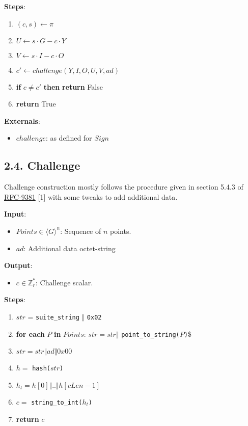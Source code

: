 \documentclass[
]{article}
\providecommand{\tightlist}{%
  \setlength{\itemsep}{0pt}\setlength{\parskip}{0pt}}
\begin{document}
\textbf{Steps}:

\begin{enumerate}
\def\labelenumi{\arabic{enumi}.}
\tightlist
\item
  \((c, s) \leftarrow \pi\)
\item
  \(U \leftarrow s \cdot G - c \cdot Y\)
\item
  \(V \leftarrow s \cdot I - c \cdot O\)
\item
  \(c' \leftarrow challenge(Y, I, O, U, V, ad)\)
\item
  \textbf{if} \(c \neq c'\) \textbf{then} \textbf{return} False
\item
  \textbf{return} True
\end{enumerate}

\textbf{Externals}:

\begin{itemize}
\tightlist
\item
  \(challenge\): as defined for \(Sign\)
\end{itemize}

\hypertarget{challenge}{%
\subsection{2.4. Challenge}\label{challenge}}

Challenge construction mostly follows the procedure given in section
5.4.3 of \href{https://datatracker.ietf.org/doc/rfc9381}{RFC-9381}
{[}1{]} with some tweaks to add additional data.

\textbf{Input}:

\begin{itemize}
\tightlist
\item
  \(Points \in \langle G \rangle^n\): Sequence of \(n\) points.
\item
  \(ad\): Additional data octet-string
\end{itemize}

\textbf{Output}:

\begin{itemize}
\tightlist
\item
  \(c \in \mathbb{Z}^*_r\): Challenge scalar.
\end{itemize}

\textbf{Steps}:

\begin{enumerate}
\def\labelenumi{\arabic{enumi}.}
\tightlist
\item
  \(str\) = \texttt{suite\_string} \(\Vert\) \texttt{0x02}
\item
  \textbf{for each} \(P\) \textbf{in} \(Points\): \(str = str \Vert\)
  \texttt{point\_to\_string(}\(P\)\texttt{)}\$
\item
  \(str = str \Vert ad \Vert 0x00\)
\item
  \(h =\) \texttt{hash(}\(str\)\texttt{)}
\item
  \(h_t = h[0] \Vert .. \Vert h[cLen - 1]\)
\item
  \(c =\) \texttt{string\_to\_int(}\(h_t\)\texttt{)}
\item
  \textbf{return} \(c\)
\end{enumerate}
\end{document}
